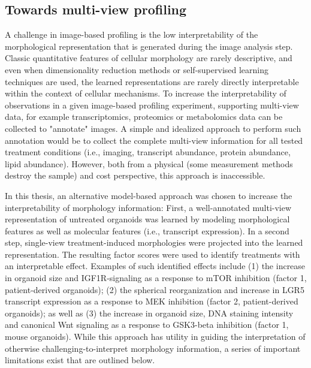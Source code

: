 \begin{flushleft}
\subsection{Towards multi-view profiling}
A challenge in image-based profiling is the low interpretability of the morphological representation that is generated during the image analysis step. Classic quantitative features of cellular morphology are rarely descriptive, and even when dimensionality reduction methods or self-supervised learning techniques are used, the learned representations are rarely directly interpretable within the context of cellular mechanisms. To increase the interpretability of observations in a given image-based profiling experiment, supporting multi-view data, for example transcriptomics, proteomics or metabolomics data can be collected to "annotate" images. A simple and idealized approach to perform such annotation would be to collect the complete multi-view information for all tested treatment conditions (i.e., imaging, transcript abundance, protein abundance, lipid abundance). However, both from a physical (some measurement methods destroy the sample) and cost perspective, this approach is inaccessible. 
\smallbreak

In this thesis, an alternative model-based approach was chosen to increase the interpretability of morphology information: First, a well-annotated multi-view representation of untreated organoids was learned by modeling morphological features as well as molecular features (i.e., transcript expression). In a second step, single-view treatment-induced morphologies were projected into the learned representation. The resulting factor scores were used to identify treatments with an interpretable effect. Examples of such identified effects include (1) the increase in organoid size and IGF1R-signaling as a response to mTOR inhibition (factor 1, patient-derived organoids); (2) the spherical reorganization and increase in LGR5 transcript expression as a response to MEK inhibition (factor 2, patient-derived organoids); as well as (3) the increase in organoid size, DNA staining intensity and canonical Wnt signaling as a response to GSK3-beta inhibition (factor 1, mouse organoids). While this approach has utility in guiding the interpretation of otherwise challenging-to-interpret morphology information, a series of important limitations exist that are outlined below.
\smallbreak


\end{flushleft}
